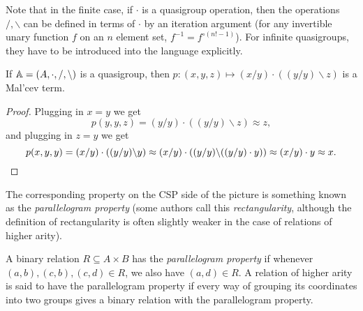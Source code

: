 \documentclass[letterpaper,11pt]{article}
\begin{document}
Note that in the finite case, if $\cdot$ is a quasigroup operation, then the operations $/, \backslash$ can be defined in terms of $\cdot$ by an iteration argument (for any invertible unary function $f$ on an $n$ element set, $f^{-1} = f^{\circ (n!-1)}$). For infinite quasigroups, they have to be introduced into the language explicitly.

\begin{prop} If $\mathbb{A} = (A, \cdot, /, \backslash)$ is a quasigroup, then $p: (x,y,z) \mapsto (x/y)\cdot((y/y)\backslash z)$ is a Mal'cev term.
\end{prop}
\begin{proof} Plugging in $x=y$ we get
\[
p(y,y,z) = (y/y)\cdot((y/y)\backslash z) \approx z,
\]
and plugging in $z=y$ we get
\[
p(x,y,y) = (x/y)\cdot ((y/y)\backslash y) \approx (x/y)\cdot ((y/y)\backslash ((y/y)\cdot y)) \approx (x/y)\cdot y \approx x.\qedhere
\]
\end{proof}


The corresponding property on the CSP side of the picture is something known as the \emph{parallelogram property} (some authors call this \emph{rectangularity}, although the definition of rectangularity is often slightly weaker in the case of relations of higher arity).

\begin{defn} A binary relation $R \subseteq A\times B$ has the \emph{parallelogram property} if whenever $(a,b), (c,b), (c,d) \in R$, we also have $(a,d) \in R$. A relation of higher arity is said to have the parallelogram property if every way of grouping its coordinates into two groups gives a binary relation with the parallelogram property.
\end{defn}
\end{document}
